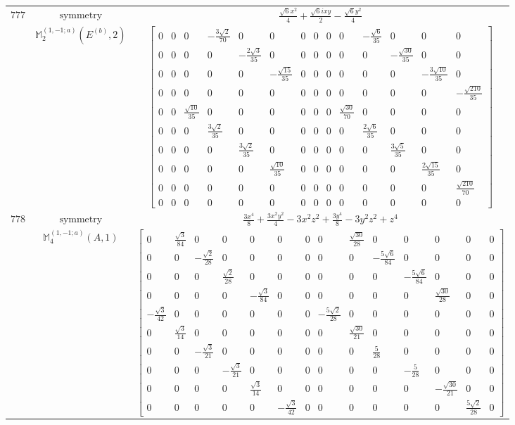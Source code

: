 \documentclass[fleqn,8pt,landscape]{jsarticle}
\begin{document}
\begin{longtable}{ccc}
$ 777 $ & $ \text{symmetry} $ & $ \frac{\sqrt{6} x^{2}}{4} + \frac{\sqrt{6} i x y}{2} - \frac{\sqrt{6} y^{2}}{4} $ \\
$  $ & $ \mathbb{M}_{2}^{(1,-1;a)}(E^{(b)},2) $ & $ \begin{bmatrix} 0 & 0 & 0 & - \frac{3 \sqrt{2}}{70} & 0 & 0 & 0 & 0 & 0 & 0 & - \frac{\sqrt{6}}{35} & 0 & 0 & 0 \\ 0 & 0 & 0 & 0 & - \frac{2 \sqrt{3}}{35} & 0 & 0 & 0 & 0 & 0 & 0 & - \frac{\sqrt{30}}{35} & 0 & 0 \\ 0 & 0 & 0 & 0 & 0 & - \frac{\sqrt{15}}{35} & 0 & 0 & 0 & 0 & 0 & 0 & - \frac{3 \sqrt{10}}{35} & 0 \\ 0 & 0 & 0 & 0 & 0 & 0 & 0 & 0 & 0 & 0 & 0 & 0 & 0 & - \frac{\sqrt{210}}{35} \\ 0 & 0 & \frac{\sqrt{10}}{35} & 0 & 0 & 0 & 0 & 0 & 0 & \frac{\sqrt{30}}{70} & 0 & 0 & 0 & 0 \\ 0 & 0 & 0 & \frac{3 \sqrt{2}}{35} & 0 & 0 & 0 & 0 & 0 & 0 & \frac{2 \sqrt{6}}{35} & 0 & 0 & 0 \\ 0 & 0 & 0 & 0 & \frac{3 \sqrt{2}}{35} & 0 & 0 & 0 & 0 & 0 & 0 & \frac{3 \sqrt{5}}{35} & 0 & 0 \\ 0 & 0 & 0 & 0 & 0 & \frac{\sqrt{10}}{35} & 0 & 0 & 0 & 0 & 0 & 0 & \frac{2 \sqrt{15}}{35} & 0 \\ 0 & 0 & 0 & 0 & 0 & 0 & 0 & 0 & 0 & 0 & 0 & 0 & 0 & \frac{\sqrt{210}}{70} \\ 0 & 0 & 0 & 0 & 0 & 0 & 0 & 0 & 0 & 0 & 0 & 0 & 0 & 0 \end{bmatrix} $ \\ \hline
$ 778 $ & $ \text{symmetry} $ & $ \frac{3 x^{4}}{8} + \frac{3 x^{2} y^{2}}{4} - 3 x^{2} z^{2} + \frac{3 y^{4}}{8} - 3 y^{2} z^{2} + z^{4} $ \\
$  $ & $ \mathbb{M}_{4}^{(1,-1;a)}(A,1) $ & $ \begin{bmatrix} 0 & \frac{\sqrt{3}}{84} & 0 & 0 & 0 & 0 & 0 & 0 & \frac{\sqrt{30}}{28} & 0 & 0 & 0 & 0 & 0 \\ 0 & 0 & - \frac{\sqrt{2}}{28} & 0 & 0 & 0 & 0 & 0 & 0 & - \frac{5 \sqrt{6}}{84} & 0 & 0 & 0 & 0 \\ 0 & 0 & 0 & \frac{\sqrt{2}}{28} & 0 & 0 & 0 & 0 & 0 & 0 & - \frac{5 \sqrt{6}}{84} & 0 & 0 & 0 \\ 0 & 0 & 0 & 0 & - \frac{\sqrt{3}}{84} & 0 & 0 & 0 & 0 & 0 & 0 & \frac{\sqrt{30}}{28} & 0 & 0 \\ - \frac{\sqrt{3}}{42} & 0 & 0 & 0 & 0 & 0 & 0 & - \frac{5 \sqrt{2}}{28} & 0 & 0 & 0 & 0 & 0 & 0 \\ 0 & \frac{\sqrt{3}}{14} & 0 & 0 & 0 & 0 & 0 & 0 & \frac{\sqrt{30}}{21} & 0 & 0 & 0 & 0 & 0 \\ 0 & 0 & - \frac{\sqrt{3}}{21} & 0 & 0 & 0 & 0 & 0 & 0 & \frac{5}{28} & 0 & 0 & 0 & 0 \\ 0 & 0 & 0 & - \frac{\sqrt{3}}{21} & 0 & 0 & 0 & 0 & 0 & 0 & - \frac{5}{28} & 0 & 0 & 0 \\ 0 & 0 & 0 & 0 & \frac{\sqrt{3}}{14} & 0 & 0 & 0 & 0 & 0 & 0 & - \frac{\sqrt{30}}{21} & 0 & 0 \\ 0 & 0 & 0 & 0 & 0 & - \frac{\sqrt{3}}{42} & 0 & 0 & 0 & 0 & 0 & 0 & \frac{5 \sqrt{2}}{28} & 0 \end{bmatrix} $ \\ \hline

\end{longtable}
\end{document}
